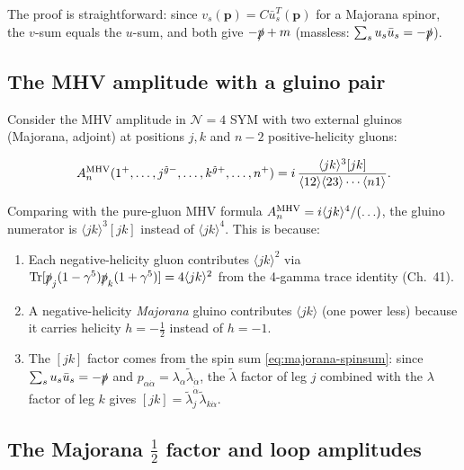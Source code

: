 \documentclass[12pt]{article}
\DeclareMathOperator\Tr{Tr}
\begin{document}
The proof is straightforward: since $v_s(\mathbf{p}) = C\bar u_s^T(\mathbf{p})$
for a Majorana spinor, the $v$-sum equals the $u$-sum, and both give $-\slashed{p}+m$
(massless: $\sum_s u_s\bar u_s = -\slashed{p}$).

\subsection{The MHV amplitude with a gluino pair}

Consider the MHV amplitude in $\mathcal{N}=4$ SYM with two external gluinos
(Majorana, adjoint) at positions $j,k$ and $n-2$ positive-helicity gluons:

\begin{mdframed}[backgroundcolor=blue!5]
\begin{equation}\label{eq:mhv-gluino}
  A_n^{\rm MHV}(1^+,\ldots,j^{\tilde g-},\ldots,k^{\tilde g+},\ldots,n^+)
  = i\,\frac{\langle jk\rangle^3 [jk]}
            {\langle12\rangle\langle23\rangle\cdots\langle n1\rangle}.
\end{equation}
\end{mdframed}

Comparing with the pure-gluon MHV formula $A_n^{\rm MHV} = i\langle jk\rangle^4/(\ldots)$,
the gluino numerator is $\langle jk\rangle^3[jk]$ instead of $\langle jk\rangle^4$.
This is because:
\begin{enumerate}
  \item Each negative-helicity gluon contributes $\langle jk\rangle^2$ via
        $\Tr[\slashed{p}_j(1-\gamma^5)\slashed{p}_k(1+\gamma^5)] = 4\langle jk\rangle^2$
        from the 4-gamma trace identity (Ch.~41).
  \item A negative-helicity \emph{Majorana} gluino contributes $\langle jk\rangle$
        (one power less) because it carries helicity $h=-\tfrac12$ instead of $h=-1$.
  \item The $[jk]$ factor comes from the spin sum \eqref{eq:majorana-spinsum}: since
        $\sum_s u_s\bar u_s = -\slashed{p}$ and $p_{\alpha\dot\alpha} = \lambda_\alpha\tilde\lambda_{\dot\alpha}$,
        the $\tilde\lambda$ factor of leg $j$ combined with the $\lambda$ factor of leg $k$
        gives $[jk] = \tilde\lambda_j^{\dot\alpha}\tilde\lambda_{k\dot\alpha}$.
\end{enumerate}

\subsection{The Majorana $\tfrac{1}{2}$ factor and loop amplitudes}
\end{document}
